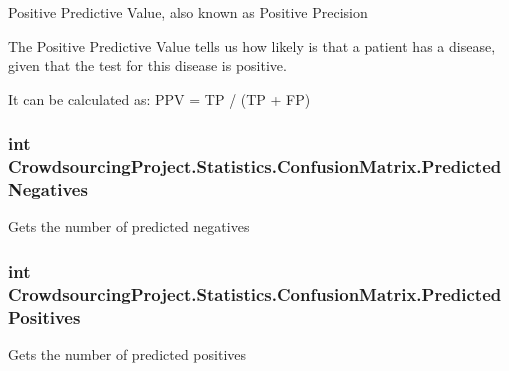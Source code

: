 Positive Predictive Value, also known as Positive Precision 

The Positive Predictive Value tells us how likely is that a patient has a disease, given that the test for this disease is positive.

It can be calculated as\+: P\+P\+V = T\+P / (T\+P + F\+P) \hypertarget{class_crowdsourcing_project_1_1_statistics_1_1_confusion_matrix_a3206bbbeb0b665b1b597bd02d21a3b07}{}
\subsubsection[{Predicted\+Negatives}]{\setlength{\rightskip}{0pt plus 5cm}int Crowdsourcing\+Project.\+Statistics.\+Confusion\+Matrix.\+Predicted\+Negatives\hspace{0.3cm}{\ttfamily [get]}}\label{class_crowdsourcing_project_1_1_statistics_1_1_confusion_matrix_a3206bbbeb0b665b1b597bd02d21a3b07}


Gets the number of predicted negatives 

\hypertarget{class_crowdsourcing_project_1_1_statistics_1_1_confusion_matrix_a4e5867d4530373feab1bc0bedbb116c6}{}
\subsubsection[{Predicted\+Positives}]{\setlength{\rightskip}{0pt plus 5cm}int Crowdsourcing\+Project.\+Statistics.\+Confusion\+Matrix.\+Predicted\+Positives\hspace{0.3cm}{\ttfamily [get]}}\label{class_crowdsourcing_project_1_1_statistics_1_1_confusion_matrix_a4e5867d4530373feab1bc0bedbb116c6}


Gets the number of predicted positives 

\hypertarget{class_crowdsourcing_project_1_1_statistics_1_1_confusion_matrix_ac8c37fcc9f7bc87122cfb030ef4039a1}{}
